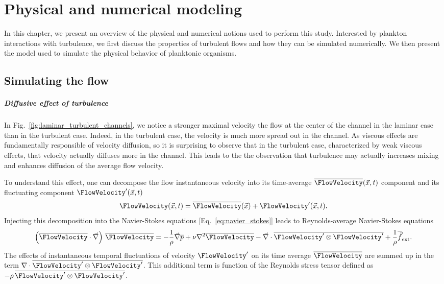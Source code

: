 \chapter{Physical and numerical modeling}\label{chap:numeric}

In this chapter, we present an overview of the physical and numerical notions used to perform this study.
Interested by plankton interactions with turbulence, we first discuss the properties of turbulent flows and how they can be simulated numerically.
We then present the model used to simulate the physical behavior of planktonic organisms.

\section{Simulating the flow}

\paragraph{Diffusive effect of turbulence}

In Fig.~\ref{fig:laminar_turbulent_channels}, we notice a stronger maximal velocity the flow at the center of the channel in the laminar case than in the turbulent case.
Indeed, in the turbulent case, the velocity is much more spread out in the channel.
As viscous effects are fundamentally responsible of velocity diffusion, so it is surprising to observe that in the turbulent case, characterized by weak viscous effects, that velocity actually diffuses more in the channel.
This leads to the the observation that turbulence may actually increases mixing and enhances diffusion of the average flow velocity.

To understand this effect, one can decompose the flow instantaneous velocity into its time-average $\overline{\FlowVelocity}(\vec{x}, t)$ component and its fluctuating component $\FlowVelocity'(\vec{x}, t)$ \citep{reynolds1895iv}
\begin{equation}
	\FlowVelocity(\vec{x}, t) = \overline{\FlowVelocity}(\vec{x}) + \FlowVelocity'(\vec{x}, t).
\end{equation}
Injecting this decomposition into the Navier-Stokes equations [Eq.~\eqref{eq:navier_stokes}] leads to Reynolds-average Navier-Stokes equations
\begin{equation}\label{eq:rans}
		\left( \overline{\FlowVelocity} \cdot \vec{\nabla} \right) \, \overline{\FlowVelocity} =
		- \frac{1}{\rho} \vec{\nabla} \overline{p} + \nu \nabla^2 \overline{\FlowVelocity} - \vec{\nabla} \cdot \overline{\FlowVelocity' \otimes \FlowVelocity'} + \frac{1}{\rho} \overline{\vec{f}}_{\mathrm{ext}}.
\end{equation}
The effects of instantaneous temporal fluctuations of velocity $\FlowVelocity'$ on its time average $\overline{\FlowVelocity}$ are summed up in the term $\nabla \cdot \overline{\FlowVelocity' \otimes \FlowVelocity'}$.
This additional term is function of the Reynolds stress tensor defined as $-\rho \, \overline{\FlowVelocity' \otimes \FlowVelocity'}$.

